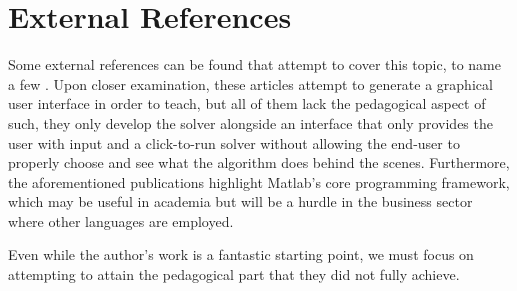\section{External References}
Some external references can be found that attempt to cover this topic, to name a few \cite{BUldingMatlabGUI} \cite{vonDohlen2020} \cite{Kosasih}. Upon closer examination, these articles attempt to generate a graphical user interface in order to teach, but all of them lack the pedagogical aspect of such, they only develop the solver alongside an interface that only provides the user with input and a click-to-run solver without allowing the end-user to properly choose and see what the algorithm does behind the scenes. Furthermore, the aforementioned publications highlight Matlab's core programming framework, which may be useful in academia but will be a hurdle in the business sector where other languages are employed.


Even while the author's work is a fantastic starting point, we must focus on attempting to attain the pedagogical part that they did not fully achieve.